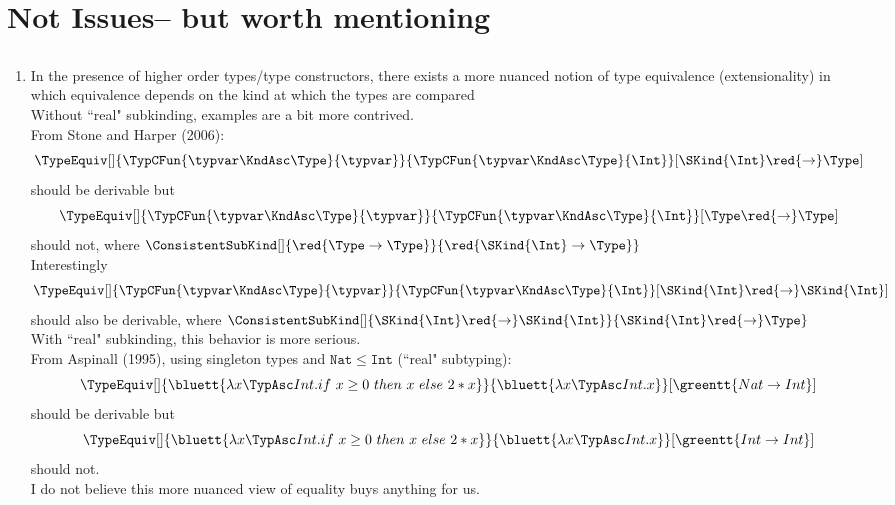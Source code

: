 \documentclass[12pt,fleqn]{article}
\begin{document}
\section{Not Issues-- but worth mentioning}
    \subsection*{}
    \begin{enumerate}[label=Nibwm \arabic*:]
        \item In the presence of higher order types/type constructors, there exists a more nuanced notion of type equivalence (extensionality) in which equivalence depends on the kind at which the types are compared \\
            Without ``real" subkinding, examples are a bit more contrived. \\
            From Stone and Harper (2006): \\
            \[
                \TypeEquiv[]{\TypCFun{\typvar\KndAsc\Type}{\typvar}}{\TypCFun{\typvar\KndAsc\Type}{\Int}}[\SKind{\Int} \red{\rightarrow} \Type]
            \]
            should be derivable but
            \[
                \TypeEquiv[]{\TypCFun{\typvar\KndAsc\Type}{\typvar}}{\TypCFun{\typvar\KndAsc\Type}{\Int}}[\Type \red{\rightarrow} \Type]
            \]
            should not, where $\ConsistentSubKind[]{\red{\Type \rightarrow \Type}}{\red{\SKind{\Int} \rightarrow \Type}}$ \\
            Interestingly
            \[
                \TypeEquiv[]{\TypCFun{\typvar\KndAsc\Type}{\typvar}}{\TypCFun{\typvar\KndAsc\Type}{\Int}}[\SKind{\Int} \red{\rightarrow} \SKind{\Int}]
            \]
            should also be derivable, where $\ConsistentSubKind[]{\SKind{\Int} \red{\rightarrow} \SKind{\Int}}{\SKind{\Int} \red{\rightarrow} \Type}$ \\
            With ``real" subkinding, this behavior is more serious. \\
            From Aspinall (1995), using singleton types and $\mathtt{Nat \le Int}$ (``real" subtyping):
            \[
                \TypeEquiv[]{\bluett{\lambda x\TypAsc Int.if~x \ge 0~then~x~else~2*x}}{\bluett{\lambda x\TypAsc Int.x}}[\greentt{Nat \rightarrow Int}]
            \]
            should be derivable but
            \[
                \TypeEquiv[]{\bluett{\lambda x\TypAsc Int.if~x \ge 0~then~x~else~2*x}}{\bluett{\lambda x\TypAsc Int.x}}[\greentt{Int \rightarrow Int}]
            \]
            should not. \\
            I do not believe this more nuanced view of equality buys anything for us.
    \end{enumerate}
\newpage
    
    
\end{document}
